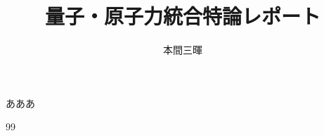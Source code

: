 \documentclass[titlepage,a4paper]{jsarticle}
\title{量子・原子力統合特論レポート}
\author{本間三暉}
\begin{document}
\maketitle
あああ
\begin{thebibliography}{99}
\bibitem{}
\end{thebibliography}
\end{document}
